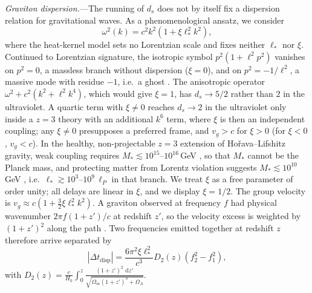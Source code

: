 \documentclass[aps,prl,reprint,twocolumn,superscriptaddress,nofootinbib,floatfix]{revtex4-2}
\newcommand{\dif}{\,\mathrm{d}}
\begin{document}
\emph{Graviton dispersion.}---The running of $d_s$ does not by itself fix a dispersion relation for gravitational waves. As a phenomenological ansatz, we consider
\begin{equation}
    \label{eq:dispersion}
    \omega^2(k) = c^2 k^2 \left( 1 + \xi \ell_\ast^2 k^2 \right),
\end{equation}
where the heat-kernel model sets no Lorentzian scale and fixes neither $\ell_\ast$ nor $\xi$. Continued to Lorentzian signature, the isotropic symbol $p^2(1 + \ell^2 p^2)$ vanishes on $p^2 = 0$, a massless branch without dispersion ($\xi = 0$), and on $p^2 = -1/\ell^2$, a massive mode with residue $-1$, i.e.\ a ghost \cite{stelle1977renormalization}. The anisotropic operator $\omega^2 + c^2(k^2 + \ell^2 k^4)$, which would give $\xi = 1$, has $d_s \to 5/2$ rather than $2$ in the ultraviolet. A quartic term with $\xi \neq 0$ reaches $d_s \to 2$ in the ultraviolet only inside a $z = 3$ theory with an additional $k^6$ term, where $\xi$ is then an independent coupling; any $\xi \neq 0$ presupposes a preferred frame, and $v_g > c$ for $\xi > 0$ (for $\xi < 0$, $v_g < c$). In the healthy, non-projectable $z = 3$ extension of Ho\v{r}ava--Lifshitz gravity, weak coupling requires $M_\ast \lesssim 10^{15}$--$10^{16}$\,GeV \cite{blas2011models}, so that $M_\ast$ cannot be the Planck mass, and protecting matter from Lorentz violation suggests $M_\ast \lesssim 10^{10}$\,GeV \cite{pospelov2012lorentz}, i.e.\ $\ell_\ast \gtrsim 10^{3}$--$10^{9}\,\ell_P$ in that branch. We treat $\xi$ as a free parameter of order unity; all delays are linear in $\xi$, and we display $\xi = 1/2$. The group velocity is $v_g \approx c(1 + \frac{3}{2}\xi \ell_\ast^2 k^2)$. A graviton observed at frequency $f$ had physical wavenumber $2\pi f (1+z')/c$ at redshift $z'$, so the velocity excess is weighted by $(1+z')^2$ along the path \cite{jacob2008lorentz, mirshekari2012constraining}. Two frequencies emitted together at redshift $z$ therefore arrive separated by
\begin{equation}
    \label{eq:delta_t}
    |\Delta t_{\mathrm{disp}}| = \frac{6 \pi^2 \xi \ell_\ast^2}{c^3} D_2(z) \left( f_2^2 - f_1^2 \right),
\end{equation}
with $D_2(z) = \frac{c}{H_0} \int_0^z \frac{(1+z')^2\,\dif z'}{\sqrt{\Omega_m(1+z')^3 + \Omega_\Lambda}}$.
\end{document}
